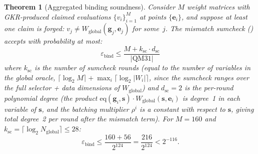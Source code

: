 \documentclass[10pt,twocolumn]{article}
\newtheorem{theorem}{Theorem}[section]
\theoremstyle{definition}
\theoremstyle{remark}
\newcommand{\QM}{\mathrm{QM31}}
\newcommand{\eq}{\mathrm{eq}}
\begin{document}
\begin{theorem}[Aggregated binding soundness]\label{thm:binding}
  Consider $M$ weight matrices with GKR-produced claimed evaluations
  $\{v_i\}_{i=1}^M$ at points $\{\mathbf{e}_i\}$, and suppose
  at least one claim is forged: $v_j \ne
  W_{\text{global}}(\mathbf{g}_j, \mathbf{e}_j)$ for some~$j$.
  The mismatch sumcheck () accepts with
  probability at most:
  \begin{equation}\label{eq:binding-sound}
    \varepsilon_{\text{bind}} \le
    \frac{M + k_{\text{sc}}
    \cdot d_{\text{sc}}}{|\QM|}
  \end{equation}
  where $k_{\text{sc}}$ is the number of sumcheck rounds
  (equal to the number of variables in the global oracle,
  $\lceil\log_2 M\rceil + \max_i \lceil\log_2 |W_i|\rceil$,
  since the sumcheck ranges over the full selector + data
  dimensions of $W_{\text{global}}$)
  and $d_{\text{sc}}=2$ is the per-round polynomial degree
  (the product $\eq(\mathbf{g}_i,\mathbf{s}) \cdot
  W_{\text{global}}(\mathbf{s},\mathbf{e}_i)$ is degree~1 in
  each variable of $\mathbf{s}$, and the batching multiplier
  $\rho^i$ is a constant with respect to $\mathbf{s}$,
  giving total degree~2 per round after the mismatch term).
  For $M=160$ and $k_{\text{sc}} = \lceil\log_2 N_{\text{global}}\rceil
  \le 28$:
  \[
    \varepsilon_{\text{bind}} \le \frac{160 + 56}{2^{124}}
    = \frac{216}{2^{124}} < 2^{-116}.
  \]
\end{theorem}
\end{document}
